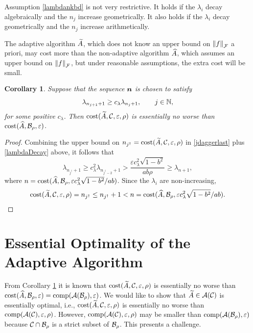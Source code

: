 \documentclass[final]{elsarticle}
\newtheorem{cor}[theorem]{Corollary}
\theoremstyle{definition}
\theoremstyle{remark}
\begin{document}
Assumption \eqref{lambdankbd} is not very restrictive.  It holds if the $\lambda_i$ decay algebraically and the $n_j$ increase geometrically.  It also holds if the $\lambda_i$ decay geometrically and the $n_j$ increase arithmetically.

The adaptive algorithm $\tA$, which does not know an upper bound on $\norm[\cf]{f}$ a priori, may cost more than the non-adaptive algorithm $\hA$, which assumes an upper bound on $\norm[\cf]{f}$, but under reasonable assumptions, the extra cost will be small.

\begin{cor} \label{cor:tAsameCosthA} Suppose that the sequence $\vn$ is chosen to satisfy
\begin{equation} \label{lambdaDecay}
\lambda_{n_{j+1}+1} \ge c_\lambda \lambda_{n_j+1}, \qquad j \in \naturals, 
\end{equation}
for some positive $c_\lambda$.  Then $\cost(\tA,\cc, \varepsilon,\rho)$ is essentially no worse than \linebreak[4]
$\cost(\hA,\cb_{\rho},\varepsilon)$. 


\end{cor}

\begin{proof}
Combining the upper bound on $n_{j^\dagger} = \cost(\tA,\cc,\varepsilon,\rho)$ in \eqref{jdaggerlast} plus  \eqref{lambdaDecay} above, it follows that
\begin{equation*}
\lambda_{n_{j^\dagger}+1} \ge c_{\lambda}^2 \lambda_{n_{j^\dagger-2}+1} > \frac{\varepsilon c_{\lambda}^2\sqrt{1 - b^2}}{ab \rho} \ge \lambda_{n+1},
\end{equation*}
where $n = \cost(\hA,\cb_{\rho},\varepsilon c_{\lambda}^2\sqrt{1 - b^2}/ab)$.
Since the $\lambda_i$ are non-increasing,
\begin{equation*}
\cost(\tA,\cc,\varepsilon,\rho) = n_{j^\dagger} \le n_{j^\dagger}+1 < n = \cost(\hA,\cb_{\rho},\varepsilon c_{\lambda}^2\sqrt{1 - b^2}/ab).
\end{equation*}
\end{proof}

\section{Essential Optimality of the Adaptive Algorithm} \label{sec:opt}

From Corollary \ref{cor:tAsameCosthA} it is known that $\cost(\tA,\cc, \varepsilon,\rho)$ is essentially no worse than
$\cost(\hA,\cb_{\rho},\varepsilon) = \comp(\ca(\cb_{\rho}),\varepsilon)$.  We would like to show that $\tA \in \ca(\cc)$ is  essentially optimal, i.e., $\cost(\tA,\cc, \varepsilon,\rho)$ is essentially no worse than  $\comp(\ca(\cc),\varepsilon,\rho)$.  However,  $\comp(\ca(\cc),\varepsilon,\rho)$ may be smaller than $\comp(\ca(\cb_{\rho}),\varepsilon)$ because $\cc \cap \cb_\rho$ is a strict subset of  $ \cb_\rho$.  This presents a challenge.
\end{document}
